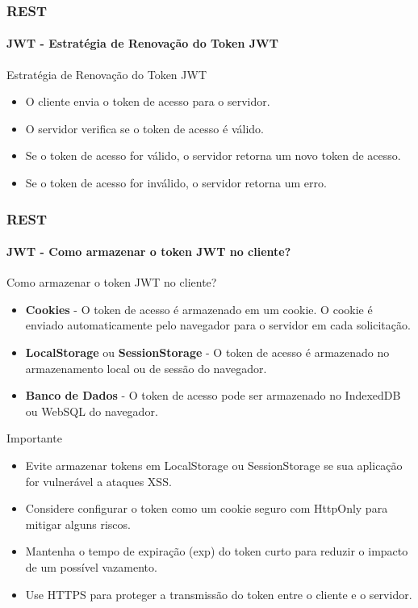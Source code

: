 \documentclass[
	9pt, %
	t, %
]{beamer}
\begin{document}
\begin{frame}
	\frametitle{REST}
	\framesubtitle{JWT - Estratégia de Renovação do Token JWT}

	\begin{block}{Estratégia de Renovação do Token JWT}
		\begin{itemize}
			\item O cliente envia o token de acesso para o servidor.
			\item O servidor verifica se o token de acesso é válido.
			\item Se o token de acesso for válido, o servidor retorna um novo token de acesso.
			\item Se o token de acesso for inválido, o servidor retorna um erro.
		\end{itemize}
	\end{block}

\end{frame}

\begin{frame}
	\frametitle{REST}
	\framesubtitle{JWT - Como armazenar o token JWT no cliente?}

	\begin{block}{Como armazenar o token JWT no cliente?}
		\begin{itemize}
			\item \textbf{Cookies} - O token de acesso é armazenado em um cookie. O cookie é enviado automaticamente pelo navegador para o servidor em cada solicitação. 
			\item \textbf{LocalStorage} ou \textbf{SessionStorage} - O token de acesso é armazenado no armazenamento local ou de sessão do navegador.
			\item \textbf{Banco de Dados} - O token de acesso pode ser armazenado no IndexedDB ou WebSQL do navegador.
		\end{itemize}
	\end{block}

	\begin{block}{Importante}
		\begin{itemize}
			\item Evite armazenar tokens em LocalStorage ou SessionStorage se sua aplicação for vulnerável a ataques XSS.
			\item Considere configurar o token como um cookie seguro com HttpOnly para mitigar alguns riscos.
			\item Mantenha o tempo de expiração (exp) do token curto para reduzir o impacto de um possível vazamento.
			\item Use HTTPS para proteger a transmissão do token entre o cliente e o servidor.
		\end{itemize}
	\end{block}

\end{frame}
\end{document}
